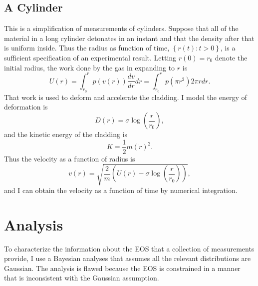 \documentclass[11pt]{article}
\begin{document}
\subsection{A Cylinder}
\label{sec:cylinder}

This is a simplification of measurements of cylinders.  Suppose that
all of the material in a long cylinder detonates in an instant and
that the density after that is uniform inside.  Thus the radius as
function of time, $\left\{r(t): t>0 \right\}$, is a sufficient
specification of an experimental result.  Letting $r(0) = r_0$ denote
the initial radius, the work done by the gas in expanding to $r$ is
\begin{equation*}
  U(r) = \int_{r_0}^r p(v(r)) \frac{dv}{dr} dr = \int_{r_0}^r p(\pi
  r^2) 2\pi r dr.
\end{equation*}
That work is used to deform and accelerate the cladding.  I model the
energy of deformation is
\begin{equation*}
  D(r) = \sigma \log \left(\frac{r}{r_0} \right),
\end{equation*}
and the kinetic energy of the cladding is
\begin{equation*}
  K = \frac{1}{2} m \left( \dot r \right)^2.
\end{equation*}
Thus the velocity as a function of radius is
\begin{equation*}
  v(r) = \sqrt{\frac{2}{m} \left( U(r) - \sigma \log
      \left(\frac{r}{r_0} \right) \right) },
\end{equation*}
and I can obtain the velocity as a function of time by numerical
integration.

\section{Analysis}
\label{sec:analysis}

To characterize the information about the EOS that a collection of
measurements provide, I use a Bayesian analyses that assumes all the
relevant distributions are Gaussian.  The analysis is flawed because
the EOS is constrained in a manner that is inconsistent with the
Gaussian assumption.
\end{document}
